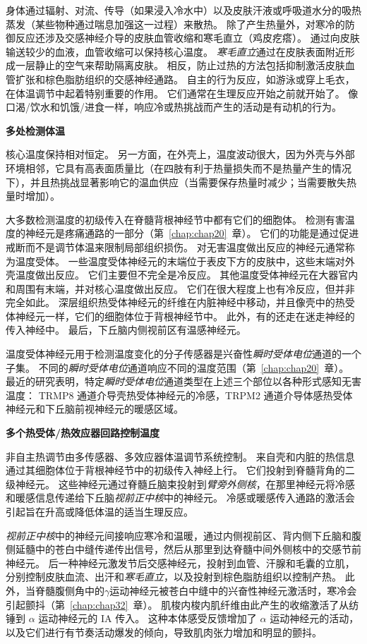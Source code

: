 身体通过辐射、对流、传导（如果浸入冷水中）以及皮肤汗液或呼吸道水分的吸热蒸发（某些物种通过喘息加强这一过程）来散热。
除了产生热量外，对寒冷的防御反应还涉及交感神经介导的皮肤血管收缩和寒毛直立（鸡皮疙瘩）。
通过向皮肤输送较少的血液，血管收缩可以保持核心温度。
\textit{寒毛直立}通过在皮肤表面附近形成一层静止的空气来帮助隔离皮肤。
相反，防止过热的方法包括抑制激活皮肤血管扩张和棕色脂肪组织的交感神经通路。
自主的行为反应，如游泳或穿上毛衣，在体温调节中起着特别重要的作用。
它们通常在生理反应开始之前就开始了。
像口渴/饮水和饥饿/进食一样，响应冷或热挑战而产生的活动是有动机的行为。


\textbf{多处检测体温}

核心温度保持相对恒定。
另一方面，在外壳上，温度波动很大，因为外壳与外部环境相邻，它具有高表面质量比（在四肢有利于热量损失而不是热量产生的情况下），并且热挑战显著影响它的温血供应（当需要保存热量时减少；当需要散失热量时增加）。


大多数检测温度的初级传入在脊髓背根神经节中都有它们的细胞体。
检测有害温度的神经元是疼痛通路的一部分（第~\ref{chap:chap20}~章）。
它们的功能是通过促进戒断而不是调节体温来限制局部组织损伤。
对无害温度做出反应的神经元通常称为温度受体。
一些温度受体神经元的末端位于表皮下方的皮肤中，这些末端对外壳温度做出反应。
它们主要但不完全是冷反应。
其他温度受体神经元在大器官内和周围有末端，并对核心温度做出反应。
它们在很大程度上也有冷反应，但并非完全如此。
深层组织热受体神经元的纤维在内脏神经中移动，并且像壳中的热受体神经元一样，它们的细胞体位于背根神经节中。
此外，有的还走在迷走神经的传入神经中。
最后，下丘脑内侧视前区有温感神经元。


温度受体神经元用于检测温度变化的分子传感器是兴奋性\textit{瞬时受体电位}通道的一个子集。
不同的\textit{瞬时受体电位}通道响应不同的温度范围（第~\ref{chap:chap20}~章）。
最近的研究表明，特定\textit{瞬时受体电位}通道类型在上述三个部位以各种形式感知无害温度：
TRMP8 通道介导壳热受体神经元的冷感，TRPM2 通道介导体感热受体神经元和下丘脑前视神经元的暖感区域。


\textbf{多个热受体/热效应器回路控制温度}

非自主热调节由多传感器、多效应器体温调节系统控制。
来自壳和内脏的热信息通过其细胞体位于背根神经节中的初级传入神经上行。
它们投射到脊髓背角的二级神经元。
这些神经元通过脊髓丘脑束投射到\textit{臂旁外侧核}，在那里神经元将冷感和暖感信息传递给下丘脑\textit{视前正中核}中的神经元。
冷感或暖感传入通路的激活会引起旨在升高或降低体温的适当生理反应。


\textit{视前正中核}中的神经元间接响应寒冷和温暖，通过内侧视前区、背内侧下丘脑和腹侧延髓中的苍白中缝传递传出信号，然后从那里到达脊髓中间外侧核中的交感节前神经元。
后一种神经元激发节后交感神经元，投射到血管、汗腺和毛囊的立肌，分别控制皮肤血流、出汗和\textit{寒毛直立}，以及投射到棕色脂肪组织以控制产热。
此外，当脊髓腹侧角中的$\gamma$运动神经元被苍白中缝中的兴奋性神经元激活时，寒冷会引起颤抖（第~\ref{chap:chap32}~章）。
肌梭内梭内肌纤维由此产生的收缩激活了从纺锤到 $ \alpha $ 运动神经元的 IA 传入。
这种本体感受反馈增加了 $ \alpha $ 运动神经元的活动，以及它们进行有节奏活动爆发的倾向，导致肌肉张力增加和明显的颤抖。



